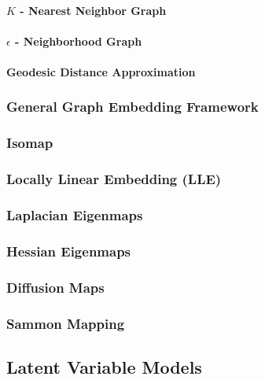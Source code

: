 \paragraph{$K$ - Nearest Neighbor Graph}

\paragraph{$\epsilon$ - Neighborhood Graph}

\paragraph{Geodesic Distance Approximation}

\subsubsection{General Graph Embedding Framework}

\subsubsection{Isomap}

\subsubsection{Locally Linear Embedding (LLE)}

\subsubsection{Laplacian Eigenmaps}

\subsubsection{Hessian Eigenmaps}

\subsubsection{Diffusion Maps}

\subsubsection{Sammon Mapping}

\subsection{Latent Variable Models}

